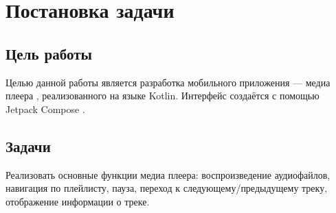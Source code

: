 \chapter{Постановка задачи}

\section{Цель работы}

Целью данной работы является разработка мобильного приложения — медиа плеера , реализованного на языке Kotlin. Интерфейс создаётся с помощью Jetpack Compose \cite{android-compose}.

\section{Задачи}
Реализовать основные функции медиа плеера: воспроизведение аудиофайлов, навигация по плейлисту, пауза, переход к следующему/предыдущему треку, отображение информации о треке.
